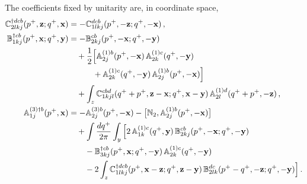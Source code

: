 The coefficients fixed by unitarity are, in coordinate space,
\begin{align}\label{eq:unitX}
\mathbb{C}^{\dagger dcb}_{2lkj}(p^+,\mathbf{z};q^+,\mathbf{x})&=-\mathbb{C}^{dcb}_{1lkj}(p^+,-\mathbf{z};q^+,-\mathbf{x})\,,\notag\\
\mathbb{B}^{\dagger cb}_{1kj}(p^+,\mathbf{x};q^+,\mathbf{y})&=-\mathbb{B}^{cb}_{2kj}(p^+,-\mathbf{x};q^+,-\mathbf{y})\notag\\
&\quad+\frac12\Big[\mathbb{A}^{(1)b}_{2j}(p^+,-\mathbf{x})\,\mathbb{A}^{(1)c}_{2k}(q^+,-\mathbf{y})\notag\\&\qquad\quad+\mathbb{A}^{(1)c}_{2k}(q^+,-\mathbf{y})\,\mathbb{A}^{(1)b}_{2j}(p^+,-\mathbf{x})\Big]
\notag\\&\quad
+\int_z\mathbb{C}^{cbd}_{1kjl}(q^++p^+,\mathbf{z}-\mathbf{x};q^+,\mathbf{x}-\mathbf{y})\,\mathbb{A}^{(1)d}_{2l}(q^++p^+,-\mathbf{z})\,,\notag\\
\mathbb{A}^{(3)\dagger b}_{1j}(p^+,\mathbf{x})&=-\mathbb{A}^{(3)b}_{2j}(p^+,-\mathbf{x})-\big[\mathbb{N}_2,\mathbb{A}^{(1)b}_{2j}(p^+,-\mathbf{x})\big]
\notag\\&\quad+\int\frac{dq^+}{2\pi}\int_y\Big[2\,\mathbb{A}^{(1)c}_{1k}(q^+,\mathbf{y})\,\mathbb{B}^{cb}_{2kj}(p^+,-\mathbf{x};q^+,-\mathbf{y})
\notag\\&\qquad
-\mathbb{B}^{\dagger cb}_{3kj}(p^+,\mathbf{x};q^+,-\mathbf{y})\,\mathbb{A}^{(1)c}_{2k}(q^+,-\mathbf{y})
\notag\\&\qquad-2\int_z\mathbb{C}^{\dagger dcb}_{1lkj}(p^+,\mathbf{x}-\mathbf{z};q^+,\mathbf{z}-\mathbf{y})\,\mathbb{B}^{dc}_{2lk}(p^+-q^+,-\mathbf{z};q^+,-\mathbf{y})\Big]\,.
\end{align}


